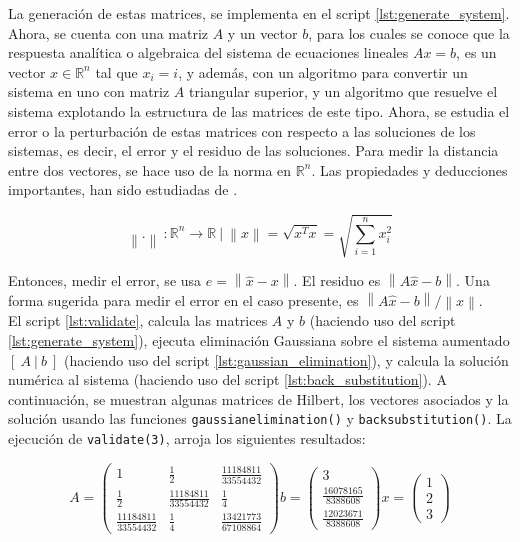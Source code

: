 \documentclass[11pt, spanish]{article}
\newcommand{\norm}[1]{\left\lVert#1\right\rVert}
\begin{document}
\begin{enumerate}
La generación de estas matrices, se implementa  en el script \ref{lst:generate_system}. Ahora, se cuenta con una matriz $A$ y un vector $b$, para los cuales se conoce que la respuesta analítica o algebraica del sistema de ecuaciones lineales $Ax = b$, es un vector $x \in \mathbb{R}^n$ tal que $x_i = i$, y además, con un algoritmo para convertir un sistema en uno con matriz $A$ triangular superior, y un algoritmo que resuelve el sistema explotando la estructura de las matrices de este tipo. Ahora, se estudia el error o la perturbación de estas matrices con respecto a las soluciones de los sistemas, es decir, el error y el residuo de las soluciones. Para medir la distancia entre dos vectores, se hace uso de la norma en $\mathbb{R}^n$. Las propiedades y deducciones importantes, han sido estudiadas de \cite{bradie2006friendly}. 

$$\norm{.}\ : \mathbb{R}^n \longrightarrow \mathbb{R}\ |\ \norm{x} = \sqrt{x^Tx} = \sqrt{\sum_{i = 1}^{n}x_i^2}$$

Entonces, medir el error, se usa $e = \norm{\hat{x} - x}$. El residuo es $\norm{A\hat{x} - b}$. Una forma sugerida para medir el error en el caso presente, es $\norm{A\hat{x} - b} / \norm{x}$.\\

El script \ref{lst:validate}, calcula las matrices $A$ y $b$ (haciendo uso del script \ref{lst:generate_system}), ejecuta eliminación Gaussiana sobre el sistema aumentado $[\ A\ |\ b\ ]$ (haciendo uso del script \ref{lst:gaussian_elimination}), y calcula la solución numérica al sistema (haciendo uso del script \ref{lst:back_substitution}). A continuación, se muestran algunas matrices de Hilbert, los vectores asociados y la solución usando las funciones \texttt{gaussianelimination()} y \texttt{backsubstitution()}.  La ejecución de \texttt{validate(3)}, arroja los siguientes resultados:

$$A = \left(\begin{array}{ccc} 1 & \frac{1}{2} & \frac{11184811}{33554432}\\ \frac{1}{2} & \frac{11184811}{33554432} & \frac{1}{4}\\ \frac{11184811}{33554432} & \frac{1}{4} & \frac{13421773}{67108864} \end{array}\right)
 b = \left(\begin{array}{c} 3\\ \frac{16078165}{8388608}\\ \frac{12023671}{8388608} \end{array}\right) x = \left(\begin{array}{c} 1\\ 2\\ 3 \end{array}\right)$$



\end{enumerate}
\end{document}

